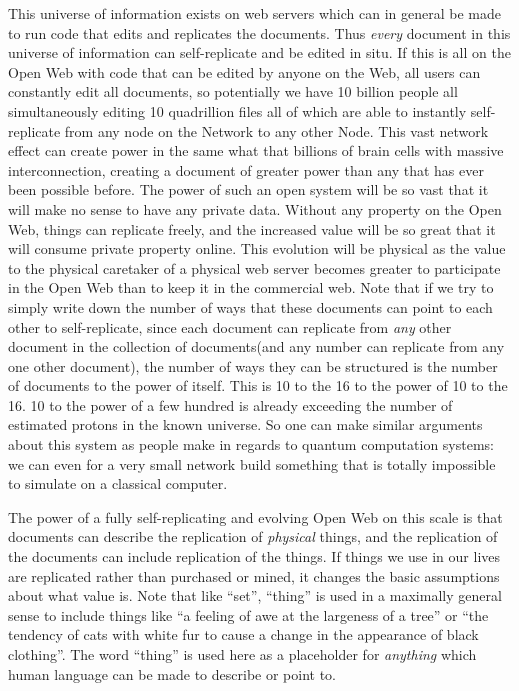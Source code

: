\documentclass[12pt,a4paper]{amsart}
\numberwithin{equation}{section}
\begin{document}
This universe of information exists on web servers which can in general
be made to run code that edits and replicates the documents. Thus
\emph{every} document in this universe of information can self-replicate
and be edited in situ. If this is all on the Open Web with code that can
be edited by anyone on the Web, all users can constantly edit all
documents, so potentially we have 10 billion people all simultaneously
editing 10 quadrillion files all of which are able to instantly
self-replicate from any node on the Network to any other Node. This vast
network effect can create power in the same what that billions of brain
cells with massive interconnection, creating a document of greater power
than any that has ever been possible before. The power of such an open
system will be so vast that it will make no sense to have any private
data. Without any property on the Open Web, things can replicate freely,
and the increased value will be so great that it will consume private
property online. This evolution will be physical as the value to the
physical caretaker of a physical web server becomes greater to
participate in the Open Web than to keep it in the commercial web. Note
that if we try to simply write down the number of ways that these
documents can point to each other to self-replicate, since each document
can replicate from \emph{any} other document in the collection of
documents(and any number can replicate from any one other document), the
number of ways they can be structured is the number of documents to the
power of itself. This is 10 to the 16 to the power of 10 to the 16. 10
to the power of a few hundred is already exceeding the number of
estimated protons in the known universe. So one can make similar
arguments about this system as people make in regards to quantum
computation systems: we can even for a very small network build
something that is totally impossible to simulate on a classical
computer.

The power of a fully self-replicating and evolving Open Web on this
scale is that documents can describe the replication of \emph{physical}
things, and the replication of the documents can include replication of
the things. If things we use in our lives are replicated rather than
purchased or mined, it changes the basic assumptions about what value
is. Note that like ``set'', ``thing'' is used in a maximally general
sense to include things like ``a feeling of awe at the largeness of a
tree'' or ``the tendency of cats with white fur to cause a change in the
appearance of black clothing''. The word ``thing'' is used here as a
placeholder for \emph{anything} which human language can be made to
describe or point to.
\end{document}
